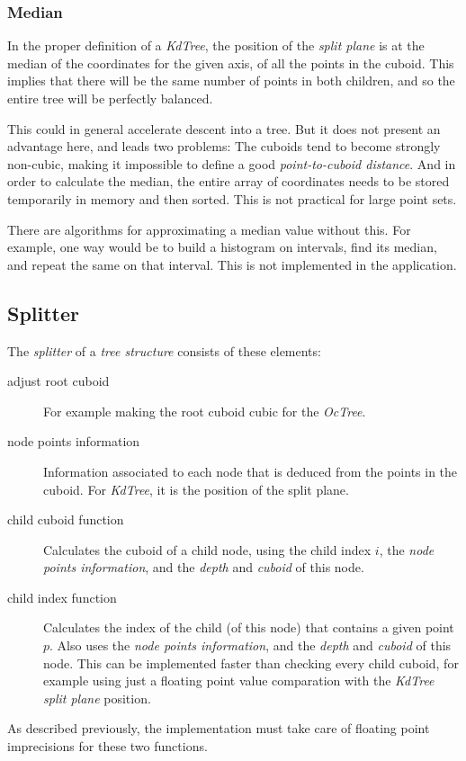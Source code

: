 \documentclass[a4paper,10pt,abstracton,notitlepage]{scrreprt}
\begin{document}
\subsubsection{Median}
In the proper definition of a \emph{KdTree}, the position of the \emph{split plane} is at the median of the coordinates for the given axis, of all the points in the cuboid. This implies that there will be the same number of points in both children, and so the entire tree will be perfectly balanced.

This could in general accelerate descent into a tree. But it does not present an advantage here, and leads two problems: The cuboids tend to become strongly non-cubic, making it impossible to define a good \emph{point-to-cuboid distance}. And in order to calculate the median, the entire array of coordinates needs to be stored temporarily in memory and then sorted. This is not practical for large point sets.

There are algorithms for approximating a median value without this. For example, one way would be to build a histogram on intervals, find its median, and repeat the same on that interval. This is not implemented in the application.

\subsection{Splitter}
The \emph{splitter} of a \emph{tree structure} consists of these elements:
\begin{description}
\item[adjust root cuboid] For example making the root cuboid cubic for the \emph{OcTree}.
\item[node points information] Information associated to each node that is deduced from the points in the cuboid. For \emph{KdTree}, it is the position of the split plane.
\item[child cuboid function] Calculates the cuboid of a child node, using the child index $i$, the \emph{node points information}, and the \emph{depth} and \emph{cuboid} of this node.
\item[child index function] Calculates the index of the child (of this node) that contains a given point $p$. Also uses the \emph{node points information}, and the \emph{depth} and \emph{cuboid} of this node. This can be implemented faster than checking every child cuboid, for example using just a floating point value comparation with the \emph{KdTree} \emph{split plane} position.
\end{description}
As described previously, the implementation must take care of floating point imprecisions for these two functions.
\end{document}
